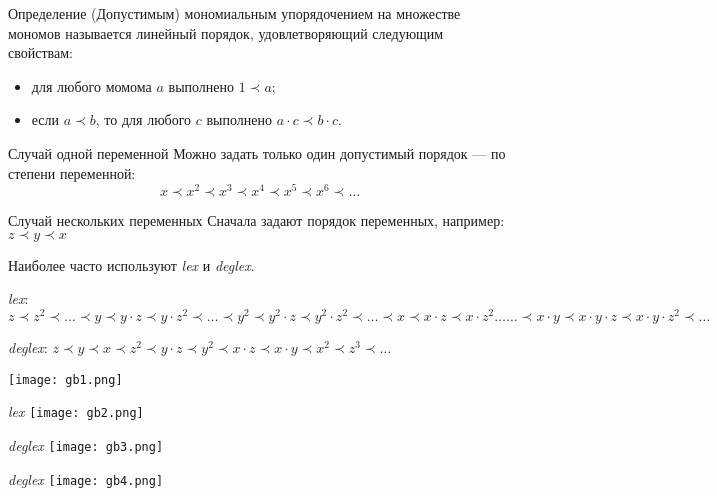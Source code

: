 \documentclass[10pt,utf8,presentation,notheorems,xcolor=dvipsnames,compress]{beamer}
\begin{document}
\begin{frame}
\begin{block}{Определение}
(Допустимым) мономиальным упорядочением на множестве мономов называется линейный порядок, 
удовлетворяющий следующим свойствам:
\begin{itemize}
\item для любого момома $a$ выполнено $1 \prec a$;
\item если $a \prec b$, то для любого $c$ выполнено $a\cdot c \prec b\cdot c$.
\end{itemize}
\end{block}

\begin{block}{Случай одной переменной}
Можно задать только один допустимый порядок --- по степени переменной:
$$x \prec x^2 \prec x^3 \prec x^4 \prec x^5 \prec x^6  \prec \ldots$$
\end{block}

\begin{block}{Случай нескольких переменных}
Сначала задают порядок переменных, например: $z \prec y \prec x$

Наиболее часто используют \emph{lex} и \emph{deglex}.

\emph{lex}: $z  \prec z^2  \prec \ldots \prec y \prec y\cdot z \prec y\cdot z^2
\prec \ldots\prec y^2 \prec y^2\cdot z  \prec y^2\cdot z^2
\prec \ldots\prec x \prec x\cdot z  \prec x\cdot z^2 \ldots \ldots\prec x\cdot y
\prec x\cdot y\cdot z \prec x\cdot y\cdot z^2 \prec \ldots$ 

\emph{deglex}: $z \prec y \prec x \prec z^2 \prec y\cdot z
 \prec y^2  \prec x\cdot z  \prec x\cdot y  \prec x^2  \prec z^3 \prec \ldots$ 
\end{block}
\end{frame}

\begin{frame}
\texttt{[image: gb1.png]}
\end{frame}

\begin{frame}{\emph{lex}}
\texttt{[image: gb2.png]}
\end{frame}

\begin{frame}{\emph{deglex}}
\texttt{[image: gb3.png]}
\end{frame}

\begin{frame}{\emph{deglex}}
\texttt{[image: gb4.png]}
\end{frame}
\end{document}
